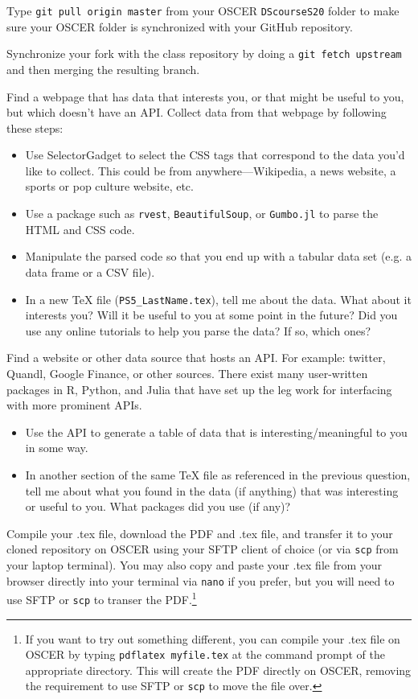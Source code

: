 \documentclass[12pt,english]{exam}
\begin{document}
\begin{questions}
\question Type \texttt{git pull origin master} from your OSCER \texttt{DScourseS20} folder to make sure your OSCER folder is synchronized with your GitHub repository. 

\question Synchronize your fork with the class repository by doing a \texttt{git fetch upstream} and then merging the resulting branch. 

\question Find a webpage that has data that interests you, or that might be useful to you, but which doesn't have an API. Collect data from that webpage by following these steps:
\begin{itemize}
    \item Use SelectorGadget to select the CSS tags that correspond to the data you'd like to collect. This could be from anywhere---Wikipedia, a news website, a sports or pop culture website, etc.
    \item Use a package such as \texttt{rvest}, \texttt{BeautifulSoup}, or \texttt{Gumbo.jl} to parse the HTML and CSS code.
    \item Manipulate the parsed code so that you end up with a tabular data set (e.g. a data frame or a CSV file).
    \item In a new TeX file (\texttt{PS5\_LastName.tex}), tell me about the data. What about it interests you? Will it be useful to you at some point in the future? Did you use any online tutorials to help you parse the data? If so, which ones?
\end{itemize}

\question Find a website or other data source that hosts an API. For example: twitter, Quandl, Google Finance, or other sources. There exist many user-written packages in R, Python, and Julia that have set up the leg work for interfacing with more prominent APIs. 
\begin{itemize}
    \item Use the API to generate a table of data that is interesting/meaningful to you in some way.
    \item In another section of the same TeX file as referenced in the previous question, tell me about what you found in the data (if anything) that was interesting or useful to you. What packages did you use (if any)?
\end{itemize}

\question Compile your .tex file, download the PDF and .tex file, and transfer it to your cloned repository on OSCER using your SFTP client of choice (or via \texttt{scp} from your laptop terminal). You may also copy and paste your .tex file from your browser directly into your terminal via \texttt{nano} if you prefer, but you will need to use SFTP or \texttt{scp} to transer the PDF.\footnote{If you want to try out something different, you can compile your .tex file on OSCER by typing \texttt{pdflatex myfile.tex} at the command prompt of the appropriate directory. This will create the PDF directly on OSCER, removing the requirement to use SFTP or \texttt{scp} to move the file over.}


\end{questions}
\end{document}
